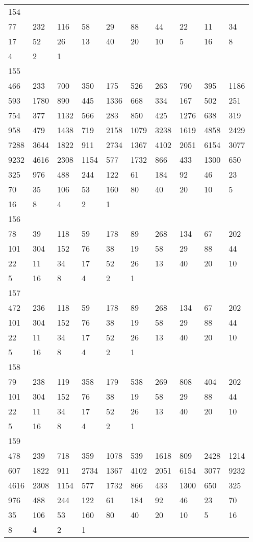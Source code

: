 \begin{longtable}{*{10}{l}}
154&&&&&&&&&\\
77& 232& 116& 58& 29& 88& 44& 22& 11& 34\\
17& 52& 26& 13& 40& 20& 10& 5& 16& 8\\
4& 2& 1& \\

155&&&&&&&&&\\
466& 233& 700& 350& 175& 526& 263& 790& 395& 1186\\
593& 1780& 890& 445& 1336& 668& 334& 167& 502& 251\\
754& 377& 1132& 566& 283& 850& 425& 1276& 638& 319\\
958& 479& 1438& 719& 2158& 1079& 3238& 1619& 4858& 2429\\
7288& 3644& 1822& 911& 2734& 1367& 4102& 2051& 6154& 3077\\
9232& 4616& 2308& 1154& 577& 1732& 866& 433& 1300& 650\\
325& 976& 488& 244& 122& 61& 184& 92& 46& 23\\
70& 35& 106& 53& 160& 80& 40& 20& 10& 5\\
16& 8& 4& 2& 1& \\

156&&&&&&&&&\\
78& 39& 118& 59& 178& 89& 268& 134& 67& 202\\
101& 304& 152& 76& 38& 19& 58& 29& 88& 44\\
22& 11& 34& 17& 52& 26& 13& 40& 20& 10\\
5& 16& 8& 4& 2& 1& \\

157&&&&&&&&&\\
472& 236& 118& 59& 178& 89& 268& 134& 67& 202\\
101& 304& 152& 76& 38& 19& 58& 29& 88& 44\\
22& 11& 34& 17& 52& 26& 13& 40& 20& 10\\
5& 16& 8& 4& 2& 1& \\

158&&&&&&&&&\\
79& 238& 119& 358& 179& 538& 269& 808& 404& 202\\
101& 304& 152& 76& 38& 19& 58& 29& 88& 44\\
22& 11& 34& 17& 52& 26& 13& 40& 20& 10\\
5& 16& 8& 4& 2& 1& \\

159&&&&&&&&&\\
478& 239& 718& 359& 1078& 539& 1618& 809& 2428& 1214\\
607& 1822& 911& 2734& 1367& 4102& 2051& 6154& 3077& 9232\\
4616& 2308& 1154& 577& 1732& 866& 433& 1300& 650& 325\\
976& 488& 244& 122& 61& 184& 92& 46& 23& 70\\
35& 106& 53& 160& 80& 40& 20& 10& 5& 16\\
8& 4& 2& 1& \\


\end{longtable}
